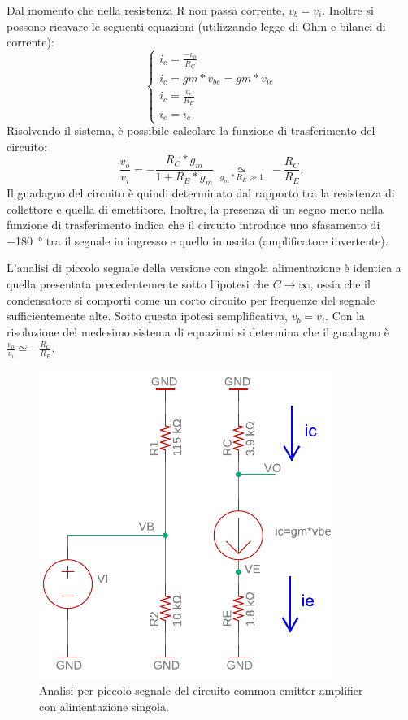 Dal momento che nella resistenza R non passa corrente, $v_b=v_i$. Inoltre si possono ricavare le seguenti equazioni (utilizzando legge di Ohm e bilanci di corrente):
\begin{equation}
	\begin{cases}
		i_c=\frac{-v_o}{R_C} \\
		i_c=gm*v_{be}=gm*v_{ie} \\
		i_c=\frac{v_e}{R_E} \\
		i_e=i_c
	\end{cases}
\end{equation}
Risolvendo il sistema, è possibile calcolare la funzione di trasferimento del circuito:
\begin{equation}
	\frac{v_o}{v_i}=-\frac{R_C*g_m}{1+R_E*g_m}\;\underset{g_m*R_E\gg 1}{\simeq}\;-\frac{R_C}{R_E}.
\end{equation}
Il guadagno del circuito è quindi determinato dal rapporto tra la resistenza di collettore e quella di emettitore. Inoltre, la presenza di un segno meno nella funzione di trasferimento indica che il circuito introduce uno sfasamento di \SI{-180}{\degree} tra il segnale in ingresso e quello in uscita (amplificatore invertente). 

L'analisi di piccolo segnale della versione con singola alimentazione è identica a quella presentata precedentemente sotto l'ipotesi che $C\to\infty$, ossia che il condensatore si comporti come un corto circuito per frequenze del segnale sufficientemente alte. Sotto questa ipotesi semplificativa, $v_b=v_i$. Con la risoluzione del medesimo sistema di equazioni si determina che il guadagno è $\frac{v_o}{v_i}\simeq-\frac{R_C}{R_E}.$
\begin{figure}[h!]
	\centering
	\includegraphics[width=0.4\linewidth]{./OtherFiles/Laboratorio 3/common emitter_se-piccolo segnale-printout}
	\caption{Analisi per piccolo segnale del circuito common emitter amplifier con alimentazione singola.}
	\label{fig:commonemitter_se_AC}
\end{figure}

